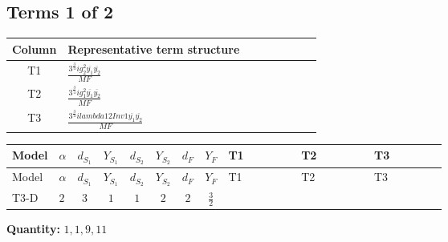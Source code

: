 \documentclass[8pt]{article}
\begin{document}
\begin{landscape}
\subsection*{Terms 1 of 2}
\begin{center}
\begin{tabular}{@{}c >{\raggedright\arraybackslash}p{0.82\linewidth}@{}}
\toprule
Column & Representative term structure \\
\midrule
T1 & \(\displaystyle \frac{3^{\frac{3}{4}} i g_{2}^{2} \overline{y_{1}} \overline{y_{2}}}{MF}\) \\
\midrule
T2 & \(\displaystyle \frac{3^{\frac{3}{4}} i g_{1}^{2} \overline{y_{1}} \overline{y_{2}}}{MF}\) \\
\midrule
T3 & \(\displaystyle \frac{3^{\frac{3}{4}} i lambda12Inv1 \overline{y_{1}} \overline{y_{2}}}{MF}\) \\
\midrule
\bottomrule
\end{tabular}
\end{center}
\smallskip
\tiny
\begin{longtable}{@{}llcccccc >{\raggedright\arraybackslash}p{0.21\linewidth} >{\raggedright\arraybackslash}p{0.21\linewidth} >{\raggedright\arraybackslash}p{0.21\linewidth}@{}}
\toprule
Model & $\alpha$ & $d_{S_1}$ & $Y_{S_1}$ & $d_{S_2}$ & $Y_{S_2}$ & $d_F$ & $Y_F$ & T1 & T2 & T3 \\
\midrule
\endfirsthead
\toprule
Model & $\alpha$ & $d_{S_1}$ & $Y_{S_1}$ & $d_{S_2}$ & $Y_{S_2}$ & $d_F$ & $Y_F$ & T1 & T2 & T3 \\
\midrule
\endhead
T3-D & $2$ & $3$ & $1$ & $1$ & $2$ & $2$ & $\frac{3}{2}$ & \scriptsize\adjustbox{max width=\linewidth}{$\begin{gathered} - \frac{11 \cdot 3^{\frac{3}{4}} i g_{2}^{2} \overline{y_{1}} \overline{y_{2}}}{8 MF}\end{gathered}$} & \scriptsize\adjustbox{max width=\linewidth}{$\begin{gathered} - \frac{9 \cdot 3^{\frac{3}{4}} i g_{1}^{2} \overline{y_{1}} \overline{y_{2}}}{8 MF}\end{gathered}$} & \scriptsize\adjustbox{max width=\linewidth}{$\begin{gathered} - \frac{3^{\frac{3}{4}} i lambda12Inv1 \overline{y_{1}} \overline{y_{2}}}{6 MF}\end{gathered}$} \\
\midrule
\bottomrule
\end{longtable}
\clearpage
\noindent\textbf{Quantity: }$\mathrm{1,1,9,11}$\par\smallskip

\end{landscape}
\end{document}
